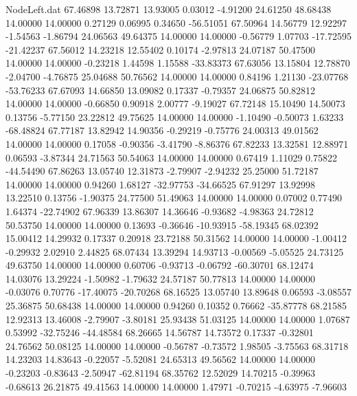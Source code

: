 \begin{filecontents}{NodeLeft.dat}
  67.46898   13.72871   13.93005     0.03012   -4.91200   24.61250   48.68438   14.00000   14.00000    0.27129    0.06995    0.34650  -56.51051
  67.50964   14.56779   12.92297    -1.54563   -1.86794   24.06563   49.64375   14.00000   14.00000   -0.56779    1.07703  -17.72595  -21.42237
  67.56012   14.23218   12.55402     0.10174   -2.97813   24.07187   50.47500   14.00000   14.00000   -0.23218    1.44598    1.15588  -33.83373
  67.63056   13.15804   12.78870    -2.04700   -4.76875   25.04688   50.76562   14.00000   14.00000    0.84196    1.21130  -23.07768  -53.76233
  67.67093   14.66850   13.09082     0.17337   -0.79357   24.06875   50.82812   14.00000   14.00000   -0.66850    0.90918    2.00777   -9.19027
  67.72148   15.10490   14.50073     0.13756   -5.77150   23.22812   49.75625   14.00000   14.00000   -1.10490   -0.50073    1.63233  -68.48824
  67.77187   13.82942   14.90356    -0.29219   -0.75776   24.00313   49.01562   14.00000   14.00000    0.17058   -0.90356   -3.41790   -8.86376
  67.82233   13.32581   12.88971     0.06593   -3.87344   24.71563   50.54063   14.00000   14.00000    0.67419    1.11029    0.75822  -44.54490
  67.86263   13.05740   12.31873    -2.79907   -2.94232   25.25000   51.72187   14.00000   14.00000    0.94260    1.68127  -32.97753  -34.66525
  67.91297   13.92998   13.22510     0.13756   -1.90375   24.77500   51.49063   14.00000   14.00000    0.07002    0.77490    1.64374  -22.74902
  67.96339   13.86307   14.36646    -0.93682   -4.98363   24.72812   50.53750   14.00000   14.00000    0.13693   -0.36646  -10.93915  -58.19345
  68.02392   15.00412   14.29932     0.17337    0.20918   23.72188   50.31562   14.00000   14.00000   -1.00412   -0.29932    2.02910    2.44825
  68.07434   13.39294   14.93713    -0.00569   -5.05525   24.73125   49.63750   14.00000   14.00000    0.60706   -0.93713   -0.06792  -60.30701
  68.12474   14.03076   13.29224    -1.50982   -1.79632   24.57187   50.77813   14.00000   14.00000   -0.03076    0.70776  -17.40075  -20.70268
  68.16525   13.05740   13.89648     0.06593   -3.08557   25.36875   50.68438   14.00000   14.00000    0.94260    0.10352    0.76662  -35.87778
  68.21585   12.92313   13.46008    -2.79907   -3.80181   25.93438   51.03125   14.00000   14.00000    1.07687    0.53992  -32.75246  -44.48584
  68.26665   14.56787   14.73572     0.17337   -0.32801   24.76562   50.08125   14.00000   14.00000   -0.56787   -0.73572    1.98505   -3.75563
  68.31718   14.23203   14.83643    -0.22057   -5.52081   24.65313   49.56562   14.00000   14.00000   -0.23203   -0.83643   -2.50947  -62.81194
  68.35762   12.52029   14.70215    -0.39963   -0.68613   26.21875   49.41563   14.00000   14.00000    1.47971   -0.70215   -4.63975   -7.96603

\end{filecontents}

